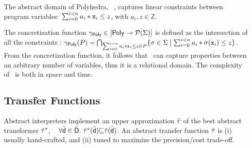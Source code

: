 \documentclass{llncs}
\newcommand{\comment}[1]{}
\begin{document}
The abstract domain of Polyhedra, \Polyhedra
~\cite{CousotHalbwachs78}, captures linear constraints between program
variables: $\sum_{i=0}^{i < n} a_i * \mathtt{x}_i \leq z$, with $a_i, z
\in \mathbb{Z}$.
\comment{
  Elements have an internal double representation (as
system of inequalities and as a set of vertexes and generators).  It
is possible to move from one representation to the other via an
expensive conversion.  Lattice operations are defined on one or the
other representation.  
}
The concretization function $\gamma_{\mathsf{Poly}}
\in [\mathsf{Poly} \rightarrow\mathcal{P}{(\Sigma)}]$ is defined as the intersection of all the constraints :
$\gamma_{\mathsf{Poly}}(P) = \bigcap_{\sum_{i=0}^{i < n} a_i * \mathtt{x}_i
\leq z \in P} \{ \sigma \in \Sigma \mid \sum_{i=0}^{i < n} a_i *
\sigma(\mathtt{x}_i) \leq z \}$.  From the concretization function, it
follows that \Polyhedra\ can capture properties between an arbitrary
number of variables, thus it is a relational domain.  The complexity
of \Polyhedra\ is  both in space and time.
\comment{
In practice, program analysis is about finding abstract domains which
represent a good trade-off between precision and cost.
}

\subsection{Transfer Functions}
\comment{
Let \dom{D} be a concrete domain, \adom{D} an abstract domain related
to the concrete by a Galois connection: $\dom{D}
\galois{\alpha}{\gamma} \adom{D}$, and $\tau \in
\funzione{\dom{D}}{\dom{D}}$ be a transfer function.  Then, by a basic
result in abstract interpretation theory, $\ael{\tau}^* \in
\funzione{\adom{D}}{\adom{D}}$ defined as $\ael{\tau}^* = \alpha \circ
\tau \circ \gamma$ is the best \emph{abstract} transfer function.  The
definition of $\ael{\tau}^*$ cannot be used in practice in the
implementation of PSA.  In general $\ael{\tau}^*$ is not computable,
and when it is, it may be too expensive to be adopted in
practice,~\cite{Yorsh04}.  Furthermore, it may be the case that
$\ael{\tau}^*$ simply does not exist.  For instance, for \Polyhedra,
there exists no best abstraction function
$\alpha$,~\cite{CousotCousot92-2}, and consequently no $\ael{\tau}^*$.
}

Abstract interpreters implement an upper approximation $\bar{\mathsf{\tau}}$ of
the best abstract transformer $\ael{\tau}^*$, \ie~ $\forall
\bar{\mathsf{d}}\in\bar{\mathsf{D}}.~ \bar{\mathsf{\tau}}^*(\bar{\mathsf{d}}) {\sqsubseteq}
\bar{\mathsf{\tau}}(\bar{\mathsf{d}})$.  An abstract transfer function $\bar{\mathsf{\tau}}$ is (i)
usually hand-crafted, and (ii) tuned to maximize the precision/cost trade-off.
\end{document}
